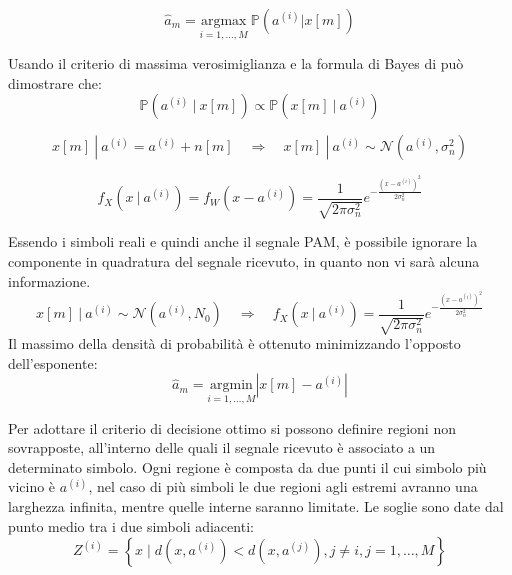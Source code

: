 \[
    \hat{a}_m = \underset{i=1,\ldots,M}{\mathrm{argmax}} \ \mathbb{P}(a^{(i)}|x[m])
\]

Usando il criterio di massima verosimiglianza e la formula di Bayes di può dimostrare che:
\[
    \mathbb{P}(a^{(i)} \ | \ x[m]) \propto  \mathbb{P}(x[m] \ | \ a^{(i)})
\]

\[
    x[m] \ | \ a^{(i)}  = a^{(i)} + n[m] \quad \Rightarrow \quad x[m] \ | \ a^{(i)} \sim \mathcal{N}(a^{(i)}, \sigma_n^2)
\]

\[
    f_X(x \ | \ a^{(i)}) = f_{W}(x - a^{(i)}) = \frac{1}{\sqrt{2\pi \sigma_n^2}} e^{-\frac{(x - a^{(i)})^2}{2\sigma_n^2}}
\]


Essendo i simboli reali e quindi anche il segnale PAM, è possibile ignorare la componente in quadratura del segnale ricevuto, in quanto non vi sarà alcuna informazione.
\[
    x[m] \ | \ a^{(i)} \sim \mathcal{N}(a^{(i)}, N_0) \quad \Rightarrow \quad f_X(x \ | \ a^{(i)}) = \frac{1}{\sqrt{2\pi \sigma_n^2}} e^{-\frac{(x - a^{(i)})^2}{2\sigma_n^2}}
\]
Il massimo della densità di probabilità è ottenuto minimizzando l'opposto dell'esponente:
\[
    \hat{a}_m = \underset{i=1,\ldots,M}{\mathrm{argmin}} \left| x[m] - a^{(i)} \right|
\]

Per adottare il criterio di decisione ottimo si possono definire regioni non sovrapposte, all'interno delle quali il segnale ricevuto è associato a un determinato simbolo.
Ogni regione è composta da due punti il cui simbolo più vicino è $a^{(i)}$, nel caso di più simboli le due regioni agli estremi avranno una larghezza infinita, mentre quelle interne saranno limitate.
Le soglie sono date dal punto medio tra i due simboli adiacenti:
\[
    Z^{(i)} = \left\{ x \mid d(x, a^{(i)}) < d(x, a^{(j)}), j \neq i, j = 1, \ldots, M \right\}
\]


\begin{center}
    
\end{center}

\begin{center}
    
\end{center}

